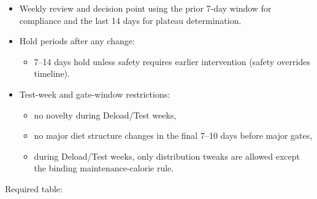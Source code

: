 \documentclass[10pt]{article}
\begin{document}
\begin{itemize}
\item Weekly review and decision point using the prior 7-day window for compliance and the last 14 days for plateau determination.
\item Hold periods after any change:
\begin{itemize}
\item 7–14 days hold unless safety requires earlier intervention (safety overrides timeline).
\end{itemize}
\item Test-week and gate-window restrictions:
\begin{itemize}
\item no novelty during Deload/Test weeks,
\item no major diet structure changes in the final 7–10 days before major gates,
\item during Deload/Test weeks, only distribution tweaks are allowed except the binding maintenance-calorie rule.
\end{itemize}
\end{itemize}

Required table:

\begingroup
\scriptsize
\setlength{\tabcolsep}{2pt}
\renewcommand{\arraystretch}{1.12}
\end{document}
